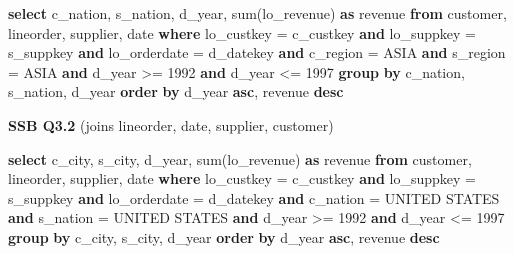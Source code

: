 \documentclass[
  10pt,
]{article}
\newenvironment{Shaded}{}{}
\newcommand{\DataTypeTok}[1]{\textcolor[rgb]{0.56,0.13,0.00}{#1}}
\newcommand{\DecValTok}[1]{\textcolor[rgb]{0.25,0.63,0.44}{#1}}
\newcommand{\FunctionTok}[1]{\textcolor[rgb]{0.02,0.16,0.49}{#1}}
\newcommand{\KeywordTok}[1]{\textcolor[rgb]{0.00,0.44,0.13}{\textbf{#1}}}
\newcommand{\NormalTok}[1]{#1}
\newcommand{\OperatorTok}[1]{\textcolor[rgb]{0.40,0.40,0.40}{#1}}
\newcommand{\StringTok}[1]{\textcolor[rgb]{0.25,0.44,0.63}{#1}}
\begin{document}
\begin{Shaded}
\begin{Highlighting}[]
\KeywordTok{select}\NormalTok{ c\_nation, s\_nation, d\_year, }\FunctionTok{sum}\NormalTok{(lo\_revenue) }\KeywordTok{as}\NormalTok{ revenue}
\KeywordTok{from}\NormalTok{ customer, lineorder, supplier, }\DataTypeTok{date}
\KeywordTok{where}\NormalTok{ lo\_custkey }\OperatorTok{=}\NormalTok{ c\_custkey }\KeywordTok{and}\NormalTok{ lo\_suppkey }\OperatorTok{=}\NormalTok{ s\_suppkey }\KeywordTok{and}\NormalTok{ lo\_orderdate }\OperatorTok{=}\NormalTok{ d\_datekey }\KeywordTok{and}\NormalTok{ c\_region }\OperatorTok{=} \StringTok{\textquotesingle{}ASIA\textquotesingle{}} \KeywordTok{and}\NormalTok{ s\_region }\OperatorTok{=} \StringTok{\textquotesingle{}ASIA\textquotesingle{}} \KeywordTok{and}\NormalTok{ d\_year }\OperatorTok{\textgreater{}=} \DecValTok{1992} \KeywordTok{and}\NormalTok{ d\_year }\OperatorTok{\textless{}=} \DecValTok{1997}
\KeywordTok{group} \KeywordTok{by}\NormalTok{ c\_nation, s\_nation, d\_year}
\KeywordTok{order} \KeywordTok{by}\NormalTok{ d\_year }\KeywordTok{asc}\NormalTok{, revenue }\KeywordTok{desc}
\end{Highlighting}
\end{Shaded}

\textbf{SSB Q3.2} (joins lineorder, date, supplier, customer)

\begin{Shaded}
\begin{Highlighting}[]
\KeywordTok{select}\NormalTok{ c\_city, s\_city, d\_year, }\FunctionTok{sum}\NormalTok{(lo\_revenue) }\KeywordTok{as}\NormalTok{ revenue}
\KeywordTok{from}\NormalTok{ customer, lineorder, supplier, }\DataTypeTok{date}
\KeywordTok{where}\NormalTok{ lo\_custkey }\OperatorTok{=}\NormalTok{ c\_custkey }\KeywordTok{and}\NormalTok{ lo\_suppkey }\OperatorTok{=}\NormalTok{ s\_suppkey }\KeywordTok{and}\NormalTok{ lo\_orderdate }\OperatorTok{=}\NormalTok{ d\_datekey }\KeywordTok{and}\NormalTok{ c\_nation }\OperatorTok{=} \StringTok{\textquotesingle{}UNITED STATES\textquotesingle{}} \KeywordTok{and}\NormalTok{ s\_nation }\OperatorTok{=} \StringTok{\textquotesingle{}UNITED STATES\textquotesingle{}} \KeywordTok{and}\NormalTok{ d\_year }\OperatorTok{\textgreater{}=} \DecValTok{1992} \KeywordTok{and}\NormalTok{ d\_year }\OperatorTok{\textless{}=} \DecValTok{1997}
\KeywordTok{group} \KeywordTok{by}\NormalTok{ c\_city, s\_city, d\_year}
\KeywordTok{order} \KeywordTok{by}\NormalTok{ d\_year }\KeywordTok{asc}\NormalTok{, revenue }\KeywordTok{desc}
\end{Highlighting}
\end{Shaded}
\end{document}
